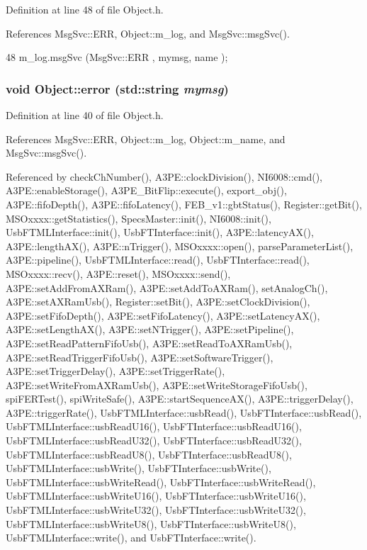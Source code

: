 Definition at line 48 of file Object.h.

References MsgSvc::ERR, Object::m\_\-log, and MsgSvc::msgSvc().


\begin{DoxyCode}
48 { m_log.msgSvc (MsgSvc::ERR     , mymsg, name ); }
\end{DoxyCode}
\hypertarget{classObject_a204a95f57818c0f811933917a30eff45}{
\subsubsection[{error}]{\setlength{\rightskip}{0pt plus 5cm}void Object::error (std::string {\em mymsg})}}
\label{classObject_a204a95f57818c0f811933917a30eff45}


Definition at line 40 of file Object.h.

References MsgSvc::ERR, Object::m\_\-log, Object::m\_\-name, and MsgSvc::msgSvc().

Referenced by checkChNumber(), A3PE::clockDivision(), NI6008::cmd(), A3PE::enableStorage(), A3PE\_\-BitFlip::execute(), export\_\-obj(), A3PE::fifoDepth(), A3PE::fifoLatency(), FEB\_\-v1::gbtStatus(), Register::getBit(), MSOxxxx::getStatistics(), SpecsMaster::init(), NI6008::init(), UsbFTMLInterface::init(), UsbFTInterface::init(), A3PE::latencyAX(), A3PE::lengthAX(), A3PE::nTrigger(), MSOxxxx::open(), parseParameterList(), A3PE::pipeline(), UsbFTMLInterface::read(), UsbFTInterface::read(), MSOxxxx::recv(), A3PE::reset(), MSOxxxx::send(), A3PE::setAddFromAXRam(), A3PE::setAddToAXRam(), setAnalogCh(), A3PE::setAXRamUsb(), Register::setBit(), A3PE::setClockDivision(), A3PE::setFifoDepth(), A3PE::setFifoLatency(), A3PE::setLatencyAX(), A3PE::setLengthAX(), A3PE::setNTrigger(), A3PE::setPipeline(), A3PE::setReadPatternFifoUsb(), A3PE::setReadToAXRamUsb(), A3PE::setReadTriggerFifoUsb(), A3PE::setSoftwareTrigger(), A3PE::setTriggerDelay(), A3PE::setTriggerRate(), A3PE::setWriteFromAXRamUsb(), A3PE::setWriteStorageFifoUsb(), spiFERTest(), spiWriteSafe(), A3PE::startSequenceAX(), A3PE::triggerDelay(), A3PE::triggerRate(), UsbFTMLInterface::usbRead(), UsbFTInterface::usbRead(), UsbFTMLInterface::usbReadU16(), UsbFTInterface::usbReadU16(), UsbFTMLInterface::usbReadU32(), UsbFTInterface::usbReadU32(), UsbFTMLInterface::usbReadU8(), UsbFTInterface::usbReadU8(), UsbFTMLInterface::usbWrite(), UsbFTInterface::usbWrite(), UsbFTMLInterface::usbWriteRead(), UsbFTInterface::usbWriteRead(), UsbFTMLInterface::usbWriteU16(), UsbFTInterface::usbWriteU16(), UsbFTMLInterface::usbWriteU32(), UsbFTInterface::usbWriteU32(), UsbFTMLInterface::usbWriteU8(), UsbFTInterface::usbWriteU8(), UsbFTMLInterface::write(), and UsbFTInterface::write().


